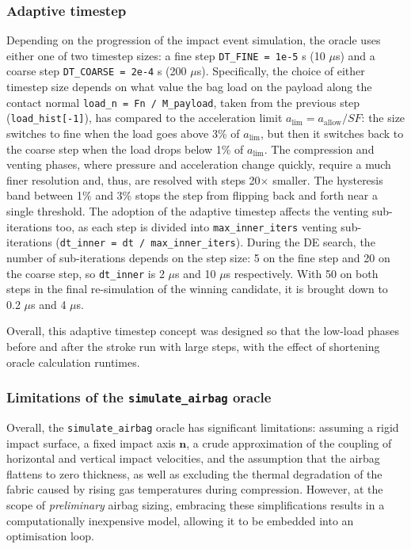 \subsubsection{Adaptive timestep}
Depending on the progression of the impact event simulation, the oracle uses either one of two timestep sizes: a fine step \texttt{DT\_FINE = 1e-5} s (10 $\mu$s) and a coarse step \texttt{DT\_COARSE = 2e-4} s (200 $\mu$s). Specifically, the choice of either timestep size depends on what value the bag load on the payload along the contact normal \texttt{load\_n = Fn / M\_payload}, taken from the previous step (\texttt{load\_hist[-1]}), has compared to the acceleration limit $a_\text{lim} = a_\text{allow}/\mathit{SF}$: the size switches to fine when the load goes above 3\% of $a_\text{lim}$, but then it switches back to the coarse step when the load drops below 1\% of $a_\text{lim}$. The compression and venting phases, where pressure and acceleration change quickly, require a much finer resolution and, thus, are resolved with steps 20$\times$ smaller. The hysteresis band between 1\% and 3\% stops the step from flipping back and forth near a single threshold. The adoption of the adaptive timestep affects the venting sub-iterations too, as each step is divided into \texttt{max\_inner\_iters} venting sub-iterations (\texttt{dt\_inner = dt / max\_inner\_iters}). During the DE search, the number of sub-iterations depends on the step size: 5 on the fine step and 20 on the coarse step, so \texttt{dt\_inner} is 2 $\mu$s and 10 $\mu$s respectively. With 50 on both steps in the final re-simulation of the winning candidate, it is brought down to 0.2 $\mu$s and 4 $\mu$s.

Overall, this adaptive timestep concept was designed so that the low-load phases before and after the stroke run with large steps, with the effect of shortening oracle calculation runtimes. 


\subsubsection{Limitations of the \texttt{simulate\_airbag} oracle}
Overall, the \texttt{simulate\_airbag} oracle has significant limitations: assuming a rigid impact surface, a fixed impact axis $\mathbf{n}$, a crude approximation of the coupling of horizontal and vertical impact velocities, and the assumption that the airbag flattens to zero thickness, as well as excluding the thermal degradation of the fabric caused by rising gas temperatures during compression. However, at the scope of \textit{preliminary} airbag sizing, embracing these simplifications results in a computationally inexpensive model, allowing it to be embedded into an optimisation loop. 

